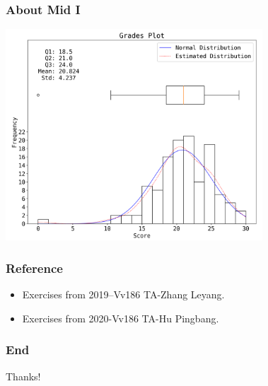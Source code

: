 \documentclass{beamer}
\begin{document}
\begin{frame}
    \frametitle{About Mid I}
    \centering
    \includegraphics[width=0.72\textwidth]{mid1_dist.png}
\end{frame}
\begin{frame}
    \frametitle{Reference}
    \begin{itemize}
        \item Exercises from 2019–Vv186 TA-Zhang Leyang.
        \item Exercises from 2020-Vv186 TA-Hu Pingbang.
    \end{itemize}
\end{frame}
\begin{frame}
    \frametitle{End}
    \centering
    \LARGE{Thanks!}
    

\end{frame}
\end{document}
